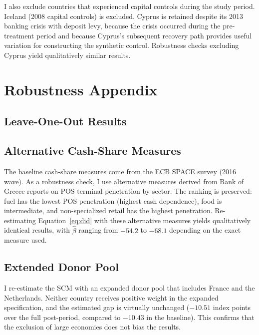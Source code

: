 \documentclass[12pt]{article}
\begin{document}
I also exclude countries that experienced capital controls during the study period. Iceland (2008 capital controls) is excluded. Cyprus is retained despite its 2013 banking crisis with deposit levy, because the crisis occurred during the pre-treatment period and because Cyprus's subsequent recovery path provides useful variation for constructing the synthetic control. Robustness checks excluding Cyprus yield qualitatively similar results.


\section{Robustness Appendix}
\label{app:robustness}

\subsection{Leave-One-Out Results}



\subsection{Alternative Cash-Share Measures}

The baseline cash-share measures come from the ECB SPACE survey (2016 wave). As a robustness check, I use alternative measures derived from Bank of Greece reports on POS terminal penetration by sector. The ranking is preserved: fuel has the lowest POS penetration (highest cash dependence), food is intermediate, and non-specialized retail has the highest penetration. Re-estimating Equation~\ref{eq:did} with these alternative measures yields qualitatively identical results, with $\hat{\beta}$ ranging from $-54.2$ to $-68.1$ depending on the exact measure used.

\subsection{Extended Donor Pool}

I re-estimate the SCM with an expanded donor pool that includes France and the Netherlands. Neither country receives positive weight in the expanded specification, and the estimated gap is virtually unchanged ($-10.51$ index points over the full post-period, compared to $-10.43$ in the baseline). This confirms that the exclusion of large economies does not bias the results.
\end{document}
